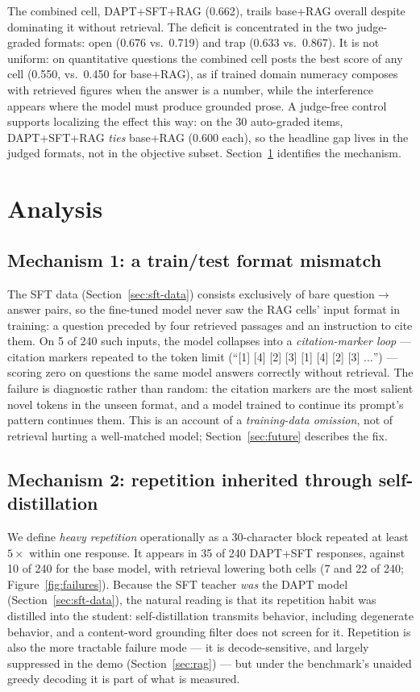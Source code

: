 \documentclass[11pt]{article}
\begin{document}
The combined cell, DAPT+SFT+RAG (0.662), trails base+RAG overall despite
dominating it without retrieval. The deficit is concentrated in the two
judge-graded formats: open (0.676 vs.\ 0.719) and trap (0.633
vs.\ 0.867). It is not uniform: on quantitative questions the combined
cell posts the best score of any cell (0.550, vs.\ 0.450 for base+RAG),
as if trained domain numeracy composes with retrieved figures when the
answer is a number, while the interference appears where the model must
produce grounded prose. A judge-free control supports localizing the
effect this way: on the 30 auto-graded items, DAPT+SFT+RAG \emph{ties}
base+RAG (0.600 each), so the headline gap lives in the judged formats,
not in the objective subset. Section~\ref{sec:analysis} identifies the
mechanism.

\section{Analysis}
\label{sec:analysis}

\subsection{Mechanism 1: a train/test format mismatch}

The SFT data (Section~\ref{sec:sft-data}) consists exclusively of bare
question$\rightarrow$answer pairs, so the fine-tuned model never saw the
RAG cells' input format in training: a question preceded
by four retrieved passages and an instruction to cite them. On 5 of 240
such inputs, the model collapses into a \emph{citation-marker loop} ---
citation markers repeated to the token limit
(``[1] [4] [2] [3] [1] [4] [2] [3] $\ldots$'') --- scoring zero on
questions the same model answers correctly without retrieval. The
failure is diagnostic rather than random: the citation markers are the
most salient novel tokens in the unseen format, and a model trained to
continue its prompt's pattern continues them. This is an account
of a \emph{training-data omission}, not of retrieval hurting a
well-matched model; Section~\ref{sec:future} describes the fix.

\subsection{Mechanism 2: repetition inherited through self-distillation}

We define \emph{heavy repetition} operationally as a 30-character block
repeated at least $5\times$ within one response. It appears in 35 of 240
DAPT+SFT responses, against 10 of 240 for the base model, with retrieval
lowering both cells (7 and 22 of 240; Figure~\ref{fig:failures}). Because the
SFT teacher \emph{was} the DAPT model (Section~\ref{sec:sft-data}), the
natural reading is that its repetition habit was distilled into the
student: self-distillation transmits behavior,
including degenerate behavior, and a content-word grounding filter does
not screen for it. Repetition is also the more tractable failure mode
--- it is decode-sensitive, and largely suppressed in the demo
(Section~\ref{sec:rag}) --- but under the
benchmark's unaided greedy decoding it is part of what is measured.
\end{document}
